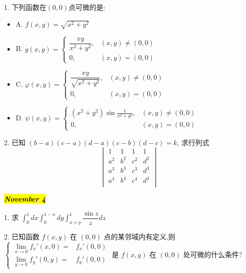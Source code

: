 1. 下列函数在$(0,0)$点可微的是:
\begin{itemize}
	\item A. $f(x,y)=\sqrt{x^2+y^2}$
	\item B. $g(x,y)=
	\begin{cases}
		\dfrac{xy}{x^2+y^2}, &(x,y)\neq (0,0)\\
		0, &(x,y)=(0,0)
	\end{cases}$
	\item C. $\varphi(x,y)=
	\begin{cases}
		\dfrac{xy}{\sqrt{x^2+y^2}}, &(x,y)\neq (0,0)\\
		0, &(x,y)=(0,0)
	\end{cases}$
	\item D. $\psi(x,y)=
	\begin{cases}
		(x^2+y^2)\sin\frac{1}{x^2+y^2}, &(x,y)\neq (0,0)\\
		0, &(x,y)=(0,0)
	\end{cases}$
\end{itemize}
\begin{solution}
	
\end{solution}

2. 已知 $(b-a)(c-a)(d-a)(c-b)(d-c)=k$, 求行列式
$$\begin{vmatrix}
	  1   &   1   &  1    &  1    \\
	a^{2} & b^{2} & c^{2} & d^{2} \\
	a^{3} & b^{3} & c^{3} & d^{3} \\
	a^{4} & b^{4} & c^{4} & d^{4} \\
\end{vmatrix}$$
\begin{solution}
	
\end{solution}

\hl{\textbf{\textit{November 4}}}

1. 求 $\displaystyle{\int_{0}^{1}dx\int_{0}^{1-x}dy\int_{x+y}^{1}\dfrac{\sin z}{z}dz}$
\begin{solution}
	
\end{solution}

2. 已知函数 $f(x,y)$ 在 $(0,0)$ 点的某邻域内有定义,则 
$\begin{cases}
	\lim\limits_{x\to 0}f_{x}'(x,0)  = & f_{x}'(0,0)\\
	\lim\limits_{y\to 0}f_{y}'(0,y)  = & f_{y}'(0,0)
\end{cases}$ 是 $f(x,y)$ 在 $(0,0)$ 处可微的什么条件?
\begin{solution}
	
\end{solution}

